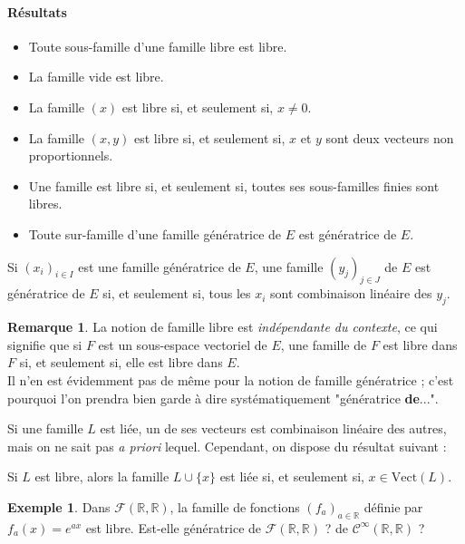 \documentclass[french]{article}
\newcommand{\R}{\mathbb{R}}
\newcommand{\Vect}{\text{Vect}}
\theoremstyle{plain}
\theoremstyle{definition}
\newtheorem*{ex}{Exemple}
\newtheorem*{rmq}{Remarque}
\theoremstyle{remark}
\begin{document}
\paragraph{Résultats}
\begin{itemize}
	\item Toute sous-famille d'une famille libre est libre.
	\item La famille vide est libre.
	\item La famille $(x)$ est libre si, et seulement si, $x\ne 0$.
	\item La famille $(x,y)$ est libre si, et seulement si, $x$ et $y$ sont deux vecteurs non proportionnels.
	\item Une famille est libre si, et seulement si, toutes ses sous-familles finies sont libres.
	\item Toute sur-famille d'une famille génératrice de $E$ est génératrice de $E$.
\end{itemize}

\begin{met}
	Si $(x_i)_{i\in I}$ est une famille génératrice de $E$, une famille $(y_j)_{j\in J}$ de $E$ est génératrice de $E$ si, et seulement si, tous les $x_i$ sont combinaison linéaire des $y_j$. 
\end{met}

\begin{rmq}
	La notion de famille libre est \textit{indépendante du contexte}, ce qui signifie que si $F$ est un sous-espace vectoriel de $E$, une famille de $F$ est libre dans $F$ si, et seulement si, elle est libre dans $E$. \\
	Il n'en est évidemment pas de même pour la notion de famille génératrice ; c'est pourquoi l'on prendra bien garde à dire systématiquement "génératrice \textbf{de}...".
\end{rmq}

Si une famille $L$ est liée, un de ses vecteurs est combinaison linéaire des autres, mais on ne sait pas \textit{a priori} lequel. Cependant, on dispose du résultat suivant :

\begin{lem}
	Si $L$ est libre, alors la famille $L\cup\{x\}$ est liée si, et seulement si, $x\in\Vect(L)$.
\end{lem}

\begin{ex}
	Dans $\mathcal{F}(\R,\R)$, la famille de fonctions $(f_a)_{a\in\R}$ définie par $f_a(x)=e^{ax}$ est libre. Est-elle génératrice de $\mathcal{F}(\R,\R)$ ? de $\mathcal{C}^\infty(\R,\R)$ ?
\end{ex}
\end{document}
